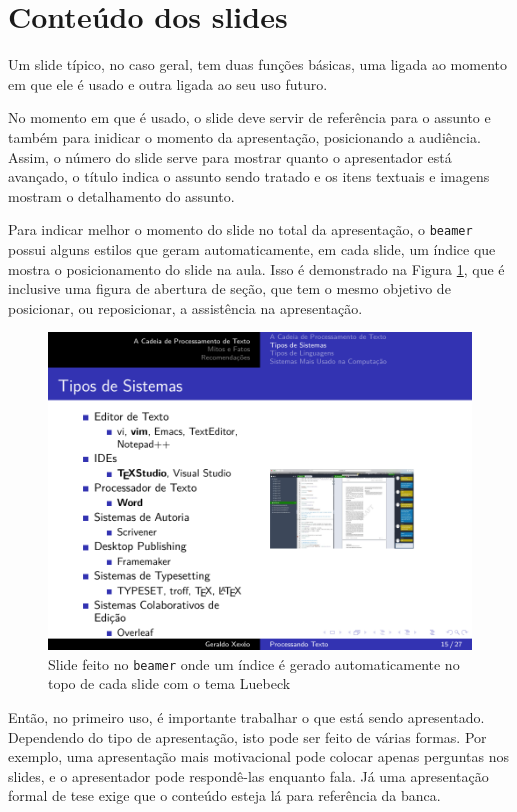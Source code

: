 \section{Conteúdo dos slides}

Um slide típico, no caso geral, tem duas funções básicas, uma ligada ao momento em que ele é usado e outra ligada ao seu uso futuro.

No momento em que é usado, o slide deve servir de referência para o assunto e também para inidicar o momento da apresentação, posicionando a audiência. Assim, o número do slide serve para mostrar quanto o apresentador está avançado, o título indica o assunto sendo tratado e os itens textuais e imagens mostram o detalhamento do assunto.

Para indicar melhor o momento do slide no total da apresentação, o \texttt{beamer} possui alguns estilos que geram automaticamente, em cada slide, um índice que mostra o posicionamento do slide na aula. Isso é demonstrado na Figura \ref{fig:sistemas}, que é inclusive uma figura de abertura de seção, que tem o mesmo objetivo de posicionar, ou reposicionar, a assistência na apresentação.

\begin{figure}[tbh]
    \centering
    \includegraphics[width=0.7\linewidth]{imagens/sistemas}
    \caption{Slide feito no \texttt{beamer} onde um índice é gerado automaticamente no topo de cada slide com o tema Luebeck}
    \label{fig:sistemas}
\end{figure}

Então, no primeiro uso, é importante trabalhar o que está sendo apresentado. Dependendo do tipo de apresentação, isto pode ser feito de várias formas. Por exemplo, uma apresentação mais motivacional pode colocar apenas perguntas nos slides, e o apresentador pode respondê-las enquanto fala. Já uma apresentação formal de tese exige que o conteúdo esteja lá para referência da banca.

